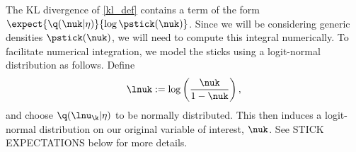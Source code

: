 The KL divergence of \eqref{kl_def} contains a term of the form $\expect{\q(\nuk
\vert \eta)}{\log \pstick(\nuk)}$.  Since we will be considering generic
densities $\pstick(\nuk)$, we will need to compute this integral numerically.
To facilitate numerical integration, we model the sticks using a logit-normal
distribution as follows.  Define
%
\begin{align*}
%
\lnuk := \log\left(\frac{\nuk}{1 - \nuk}\right),
%
\end{align*}
%
and choose $\q(\lnu_\k \vert \eta)$ to be normally distributed.  This then
induces a logit-normal distribution on our original variable of interest,
$\nuk$.  See STICK EXPECTATIONS below for more details.




\hrulefill




%
%
%

